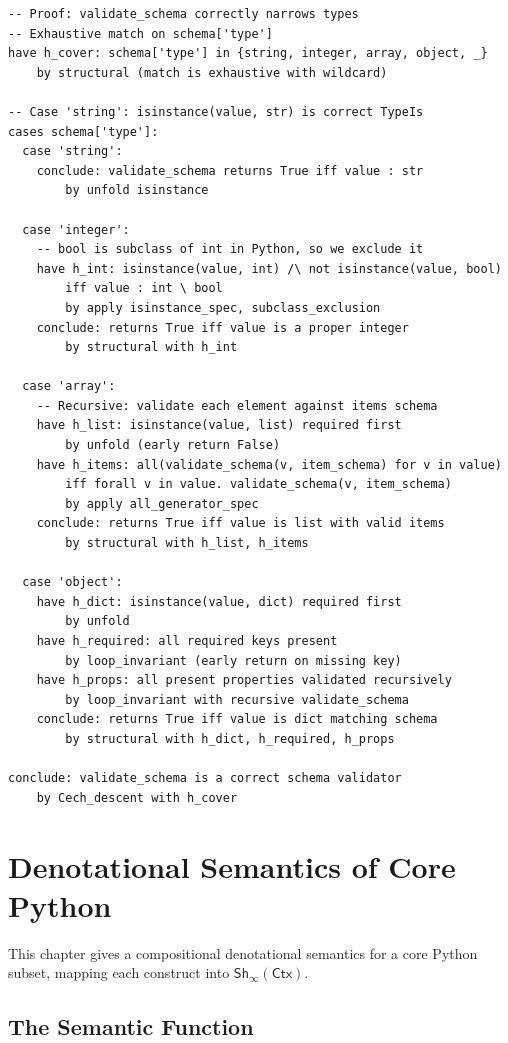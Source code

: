 \documentclass[11pt,a4paper]{report}
\theoremstyle{definition}
\theoremstyle{plain}
\newcommand{\Ctx}{\mathsf{Ctx}}
\newcommand{\Sh}{\mathsf{Sh}}
\begin{document}
\begin{lstlisting}[style=proof]
-- Proof: validate_schema correctly narrows types
-- Exhaustive match on schema['type']
have h_cover: schema['type'] in {string, integer, array, object, _}
    by structural (match is exhaustive with wildcard)

-- Case 'string': isinstance(value, str) is correct TypeIs
cases schema['type']:
  case 'string':
    conclude: validate_schema returns True iff value : str
        by unfold isinstance

  case 'integer':
    -- bool is subclass of int in Python, so we exclude it
    have h_int: isinstance(value, int) /\ not isinstance(value, bool)
        iff value : int \ bool
        by apply isinstance_spec, subclass_exclusion
    conclude: returns True iff value is a proper integer
        by structural with h_int

  case 'array':
    -- Recursive: validate each element against items schema
    have h_list: isinstance(value, list) required first
        by unfold (early return False)
    have h_items: all(validate_schema(v, item_schema) for v in value)
        iff forall v in value. validate_schema(v, item_schema)
        by apply all_generator_spec
    conclude: returns True iff value is list with valid items
        by structural with h_list, h_items

  case 'object':
    have h_dict: isinstance(value, dict) required first
        by unfold
    have h_required: all required keys present
        by loop_invariant (early return on missing key)
    have h_props: all present properties validated recursively
        by loop_invariant with recursive validate_schema
    conclude: returns True iff value is dict matching schema
        by structural with h_dict, h_required, h_props

conclude: validate_schema is a correct schema validator
    by Cech_descent with h_cover
\end{lstlisting}


\chapter{Denotational Semantics of Core Python}
\label{ch:denotational}

This chapter gives a compositional denotational semantics for a core Python
subset, mapping each construct into $\Sh_\infty(\Ctx)$.

\section{The Semantic Function}
\end{document}
